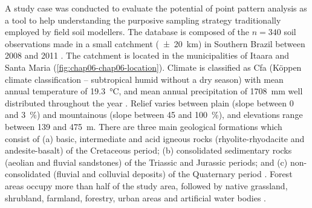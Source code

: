 A study case was conducted to evaluate the potential of point pattern analysis as a tool to help understanding 
the purposive sampling strategy traditionally employed by field soil modellers. The database is composed of 
the $n = 340$ soil observations made in a small catchment (\SI{\pm20}{\km}) in Southern Brazil between 
\num{2008} and \num{2011} \cite{SamuelRosaEtAl2011a, MiguelEtAl2012, Samuel-RosaEtAl2013}. The catchment is 
located in the municipalities of Itaara and Santa Maria (\autoref{fig:chap06-chap06-location}). Climate is 
classified as Cfa (K{\"o}ppen climate classification -- subtropical humid without a dry season) with mean 
annual temperature of \SI{19.3}{\celsius}, and mean annual precipitation of \SI{1708}{\mm} well distributed 
throughout the year \cite{Maluf2000}. Relief varies between plain (slope between \num{0} and \SI{3}{\percent}) 
and mountainous (slope between \num{45} and \SI{100}{\percent}), and elevations range between \num{139} and 
\SI{475}{\m}. There are three main geological formations which consist of (a) basic, intermediate and acid 
igneous rocks (rhyolite-rhyodacite and andesite-basalt) of the Cretaceous period; (b) consolidated sedimentary 
rocks (aeolian and fluvial sandstones) of the Triassic and Jurassic periods; and (c) non-consolidated (fluvial 
and colluvial deposits) of the Quaternary period \cite{GasparettoEtAl1988, MacielFilho1990, Sartori2009}. 
Forest areas occupy more than half of the study area, followed by native grassland, shrubland, farmland, 
forestry, urban areas and artificial water bodies \cite{SamuelRosaEtAl2011a}.


